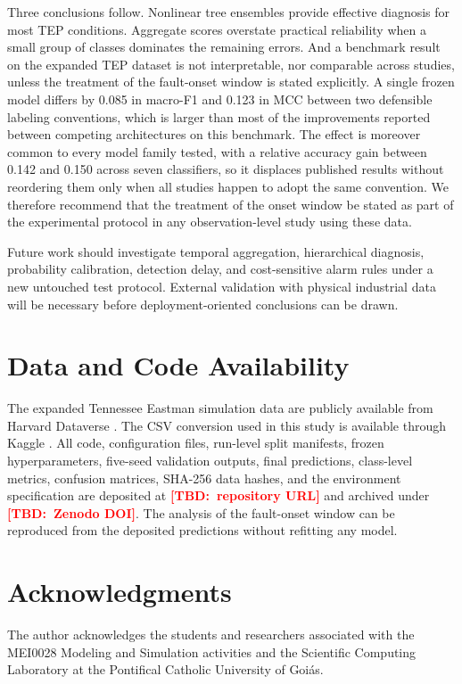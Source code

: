 \documentclass[10pt,twocolumn,a4paper]{article}
\newcommand{\TBD}[1]{\textcolor{red}{\textbf{[TBD:~#1]}}}
\begin{document}
Three conclusions follow. Nonlinear tree ensembles provide effective diagnosis
for most TEP conditions. Aggregate scores overstate practical reliability when
a small group of classes dominates the remaining errors. And a benchmark result
on the expanded TEP dataset is not interpretable, nor comparable across
studies, unless the treatment of the fault-onset window is stated explicitly.
A single frozen model differs by 0.085 in macro-F1 and 0.123 in MCC between two
defensible labeling conventions, which is larger than most of the improvements
reported between competing architectures on this benchmark. The effect is
moreover common to every model family tested, with a relative accuracy gain
between 0.142 and 0.150 across seven classifiers, so it displaces published
results without reordering them only when all studies happen to adopt the same
convention. We therefore
recommend that the treatment of the onset window be stated as part of the
experimental protocol in any observation-level study using these data.

Future work should investigate temporal aggregation, hierarchical diagnosis,
probability calibration, detection delay, and cost-sensitive alarm rules under
a new untouched test protocol. External validation with physical industrial
data will be necessary before deployment-oriented conclusions can be drawn.

\section*{Data and Code Availability}

The expanded Tennessee Eastman simulation data are publicly available from
Harvard Dataverse \cite{rieth2017data}. The CSV conversion used in this study is
available through Kaggle \cite{kaggleTEP}. All code, configuration files,
run-level split manifests, frozen hyperparameters, five-seed validation
outputs, final predictions, class-level metrics, confusion matrices, SHA-256
data hashes, and the environment specification are deposited at
\TBD{repository URL} and archived under \TBD{Zenodo DOI}. The analysis of the
fault-onset window can be reproduced from the deposited predictions without
refitting any model.

\section*{Acknowledgments}

The author acknowledges the students and researchers associated with the
MEI0028 Modeling and Simulation activities and the Scientific Computing
Laboratory at the Pontifical Catholic University of Goi\'as.
\end{document}
